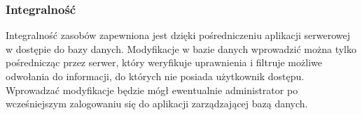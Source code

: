 \subsubsection{Integralność}
Integralność zasobów zapewniona jest dzięki pośredniczeniu aplikacji serwerowej w dostępie do bazy danych. Modyfikacje w bazie danych wprowadzić można tylko pośrednicząc przez serwer, który weryfikuje uprawnienia i filtruje możliwe odwołania do informacji, do których nie posiada użytkownik dostępu. Wprowadzać modyfikacje będzie mógł ewentualnie administrator po wcześniejszym zalogowaniu się do aplikacji zarządzającej bazą danych.
